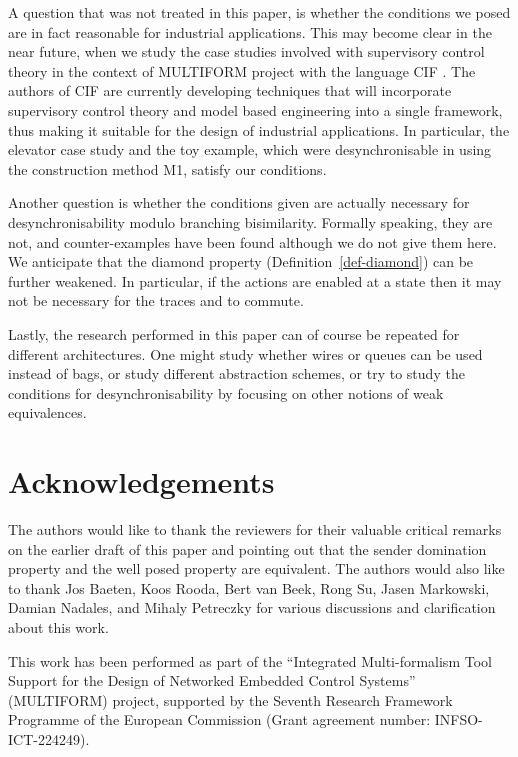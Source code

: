 \documentclass[copyright]{eptcs}
\theoremstyle{plain}
\theoremstyle{definition}
\begin{document}
A question that was not treated in this paper, is whether the conditions we posed are in fact reasonable for industrial applications. This may become clear in the near future, when we
study the case studies involved with supervisory control theory in the context of MULTIFORM project \citep{multiform} with the language CIF \citep{cif}. The authors of CIF are currently developing techniques that will incorporate supervisory control theory and model based engineering into a single framework, thus making it suitable for the design of industrial applications. In particular, the elevator case study and the toy example, which were desynchronisable in \citep{prDCL} using the construction method M1, satisfy our conditions.

Another question is whether the conditions given are actually necessary for desynchronisability modulo branching bisimilarity. Formally speaking, they are not, and counter-examples have been found although we do not give them here. We anticipate that the diamond property (Definition~\ref{def-diamond}) can be further weakened. In particular, if the actions  are enabled at a state  then it may not be necessary for the traces  and  to commute.

Lastly, the research performed in this paper can of course be repeated for different architectures. One might study whether wires or queues can be used instead of bags, or study different abstraction schemes, or try to study the conditions for desynchronisability by focusing on other notions of weak equivalences.

\section{Acknowledgements}\label{sec:ack}
The authors would like to thank the reviewers for their valuable critical remarks on the earlier draft of this paper and pointing out that the sender domination property and the well posed property are equivalent. The authors would also like to thank Jos Baeten, Koos Rooda, Bert van Beek,
Rong Su, Jasen Markowski, Damian Nadales, and Mihaly Petreczky for various discussions and clarification about this work.

This work has been performed as part of the ``Integrated Multi-formalism Tool Support for the Design of Networked Embedded Control Systems'' (MULTIFORM) project, supported by the Seventh Research Framework Programme of the European Commission (Grant agreement number: INFSO-ICT-224249).



\appendix
\end{document}

